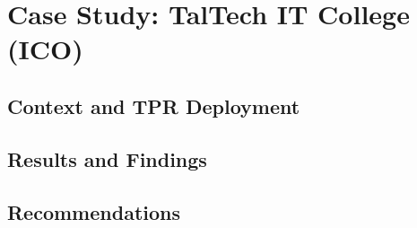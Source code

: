 
\newpage
\section{Case Study: TalTech IT College (ICO)}

\subsection{Context and \ac{TPR} Deployment}


\subsection{Results and Findings}


\subsection{Recommendations}

